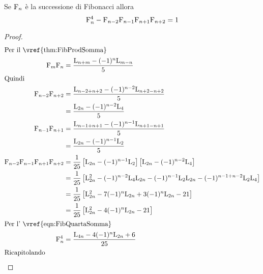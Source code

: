 \begin{thm}\label{thm:FibGelinCesaro}
	Se $\mathrm{F}_{n}$ è la successione di Fibonacci allora
	\begin{equation}
		\mathrm{F}_{n}^4-\mathrm{F}_{n-2}\mathrm{F}_{n-1}\mathrm{F}_{n+1}\mathrm{F}_{n+2}=1
	\end{equation}\label{eqn:FibGelinCesaro}
\end{thm}
\begin{proof}
	\begin{align*}
		\intertext{Per il~\vref{thm:FibProdSomma}}
		\Fib{m}\Fib{n}={}     & \dfrac{\Luc{n+m}-(-1)^n\Luc{m-n}}{5}                                                                                  \\
		\intertext{Quindi}
		\Fib{n-2}\Fib{n+2}={} & \dfrac{\Luc{n-2+n+2}-(-1)^{n-2}\Luc{n+2-n+2}}{5}                                                                      \\
		={}                   & \dfrac{\Luc{2n}-(-1)^{n-2}\Luc{4}}{5}                                                                                 \\
		\Fib{n-1}\Fib{n+1}={} & \dfrac{\Luc{n-1+n+1}-(-1)^{n-1}\Luc{n+1-n+1}}{5}                                                                      \\
		={}                   & \dfrac{\Luc{2n}-(-1)^{n-1}\Luc{2}}{5}                                                                                 \\
		\Fib{n-2}\Fib{n-1}\Fib{n+1}\Fib{n+2}
		={}                   & \dfrac{1}{25}\left[\Luc{2n}-(-1)^{n-1}\Luc{2}\right]\left[\Luc{2n}-(-1)^{n-2}\Luc{4}\right]                           \\
		={}                   & \dfrac{1}{25}\left[\Luc{2n}^2-(-1)^{n-2}\Luc{4}\Luc{2n}-(-1)^{n-1}\Luc{2}\Luc{2n}-(-1)^{n-1+n-2}\Luc{2}\Luc{4}\right] \\
		={}                   & \dfrac{1}{25}\left[\Luc{2n}^2-7(-1)^{n}\Luc{2n}+3(-1)^{n}\Luc{2n}-21\right]                                           \\
		={}                   & \dfrac{1}{25}\left[\Luc{2n}^2-4(-1)^{n}\Luc{2n}-21\right]                                                             \\
		\intertext{Per l'~\vref{eqn:FibQuartaSomma}}
		\Fib{n}^4={}          & \dfrac{\Luc{4n}-4(-1)^n\Luc{2n}+6}{25}                                                                                \\
		\intertext{Ricapitolando}

\end{align*}
\end{proof}
